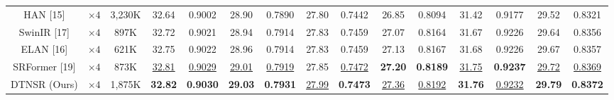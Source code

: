 \documentclass[journal]{IEEEtran}
\begin{document}
\begin{table}
\begin{tabular}{|c|c|c|cc|cc|cc|cc|cc|cc|}
HAN [15] & $\times4$ &3,230K& \multicolumn{1}{c|}{32.64 } &0.9002 & \multicolumn{1}{c|}{28.90} &0.7890 &\multicolumn{1}{c|}{27.80} &0.7442& \multicolumn{1}{c|}{26.85} &0.8094 & \multicolumn{1}{c|}{31.42} &0.9177
&\multicolumn{1}{c|}{29.52} &0.8321 \\


SwinIR [17] & $\times4$  &897K& \multicolumn{1}{c|}{32.72} &{0.9021} & \multicolumn{1}{c|}{28.94} &{0.7914}& \multicolumn{1}{c|}{27.83} &{0.7459} & \multicolumn{1}{c|}{27.07} &{0.8164}& \multicolumn{1}{c|}{31.67} &{0.9226} &\multicolumn{1}{c|}{29.64} &{0.8356}  \\

ELAN [16] & $\times 4$ &621K& \multicolumn{1}{c|}{32.75} & 0.9022 & \multicolumn{1}{c|}{28.96} & 0.7914 & \multicolumn{1}{c|}{27.83} & 0.7459 & \multicolumn{1}{c|}{27.13} &0.8167 & \multicolumn{1}{c|}{31.68} & 0.9226 &\multicolumn{1}{c|}{29.67} & 0.8357\\

SRFormer [19] & $\times 4$ &873K& \multicolumn{1}{c|}{\color{blue}\underline{32.81}} & {\color{blue}\underline{0.9029}} & \multicolumn{1}{c|}{\color{blue}\underline{29.01}} &{\color{blue}\underline{ 0.7919}} & \multicolumn{1}{c|}{27.85} & {\color{blue}\underline{0.7472}} & \multicolumn{1}{c|}{\color{red}\textbf{27.20}} & {\color{red}\textbf{0.8189}} & \multicolumn{1}{c|}{\color{blue}\underline{31.75}} &{\color{red}\textbf{0.9237}} &\multicolumn{1}{c|}{\color{blue}\underline{29.72}} & {\color{blue}\underline{ 0.8369}}\\

DTNSR (Ours) & $\times 4$ &1,875K& \multicolumn{1}{c|}{\color{red}\textbf{32.82}} &{\color{red}\textbf{0.9030}} & \multicolumn{1}{c|}{\color{red}\textbf{29.03} } &{\color{red}\textbf{ 0.7931}} & \multicolumn{1}{c|}{\color{blue}\underline{27.99}} &{\color{red}\textbf{0.7473}}& \multicolumn{1}{c|}{\color{blue}\underline{27.36}} &{\color{blue}\underline{0.8192}}& \multicolumn{1}{c|}{\color{red}\textbf{31.76}} &{\color{blue}\underline{0.9232}} &\multicolumn{1}{c|}{\color{red}\textbf{29.79}} & {\color{red}\textbf{0.8372}}\\

\hline


\end{tabular}
\end{table}
\end{document}
